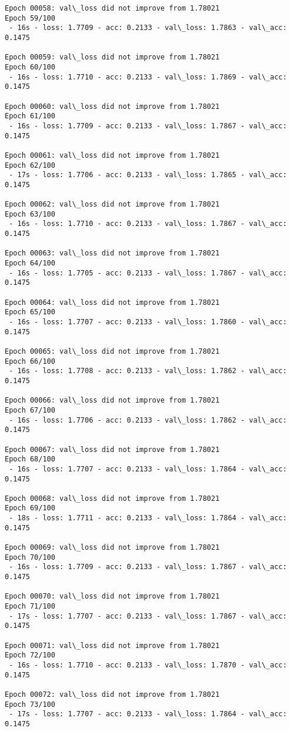 \documentclass[11pt]{article}
\begin{document}
\begin{Verbatim}[commandchars=\\\{\}]
Epoch 00058: val\_loss did not improve from 1.78021
Epoch 59/100
 - 16s - loss: 1.7709 - acc: 0.2133 - val\_loss: 1.7863 - val\_acc: 0.1475

Epoch 00059: val\_loss did not improve from 1.78021
Epoch 60/100
 - 16s - loss: 1.7710 - acc: 0.2133 - val\_loss: 1.7869 - val\_acc: 0.1475

Epoch 00060: val\_loss did not improve from 1.78021
Epoch 61/100
 - 16s - loss: 1.7709 - acc: 0.2133 - val\_loss: 1.7867 - val\_acc: 0.1475

Epoch 00061: val\_loss did not improve from 1.78021
Epoch 62/100
 - 17s - loss: 1.7706 - acc: 0.2133 - val\_loss: 1.7865 - val\_acc: 0.1475

Epoch 00062: val\_loss did not improve from 1.78021
Epoch 63/100
 - 16s - loss: 1.7710 - acc: 0.2133 - val\_loss: 1.7867 - val\_acc: 0.1475

Epoch 00063: val\_loss did not improve from 1.78021
Epoch 64/100
 - 16s - loss: 1.7705 - acc: 0.2133 - val\_loss: 1.7867 - val\_acc: 0.1475

Epoch 00064: val\_loss did not improve from 1.78021
Epoch 65/100
 - 16s - loss: 1.7707 - acc: 0.2133 - val\_loss: 1.7860 - val\_acc: 0.1475

Epoch 00065: val\_loss did not improve from 1.78021
Epoch 66/100
 - 16s - loss: 1.7708 - acc: 0.2133 - val\_loss: 1.7862 - val\_acc: 0.1475

Epoch 00066: val\_loss did not improve from 1.78021
Epoch 67/100
 - 16s - loss: 1.7706 - acc: 0.2133 - val\_loss: 1.7862 - val\_acc: 0.1475

Epoch 00067: val\_loss did not improve from 1.78021
Epoch 68/100
 - 16s - loss: 1.7707 - acc: 0.2133 - val\_loss: 1.7864 - val\_acc: 0.1475

Epoch 00068: val\_loss did not improve from 1.78021
Epoch 69/100
 - 18s - loss: 1.7711 - acc: 0.2133 - val\_loss: 1.7864 - val\_acc: 0.1475

Epoch 00069: val\_loss did not improve from 1.78021
Epoch 70/100
 - 16s - loss: 1.7709 - acc: 0.2133 - val\_loss: 1.7867 - val\_acc: 0.1475

Epoch 00070: val\_loss did not improve from 1.78021
Epoch 71/100
 - 17s - loss: 1.7707 - acc: 0.2133 - val\_loss: 1.7867 - val\_acc: 0.1475

Epoch 00071: val\_loss did not improve from 1.78021
Epoch 72/100
 - 16s - loss: 1.7710 - acc: 0.2133 - val\_loss: 1.7870 - val\_acc: 0.1475

Epoch 00072: val\_loss did not improve from 1.78021
Epoch 73/100
 - 17s - loss: 1.7707 - acc: 0.2133 - val\_loss: 1.7864 - val\_acc: 0.1475


\end{Verbatim}
\end{document}

